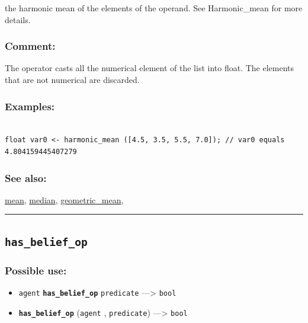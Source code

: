 \documentclass[]{book}
\providecommand{\tightlist}{%
  \setlength{\itemsep}{0pt}\setlength{\parskip}{0pt}}
\theoremstyle{definition}
\theoremstyle{definition}
\theoremstyle{definition}
\theoremstyle{remark}
\begin{document}
the harmonic mean of the elements of the operand. See Harmonic\_mean for
more details.

\subsubsection{Comment:}\label{comment-47}

The operator casts all the numerical element of the list into float. The
elements that are not numerical are discarded.

\subsubsection{Examples:}\label{examples-185}

\begin{verbatim}
 
float var0 <- harmonic_mean ([4.5, 3.5, 5.5, 7.0]); // var0 equals 4.804159445407279
\end{verbatim}

\subsubsection{See also:}\label{see-also-110}

\href{operators-i-to-m.html\#mean}{mean},
\href{operators-i-to-m.html\#median}{median},
\href{operators-d-to-h.html\#geometric_mean}{geometric\_mean},

\begin{center}\rule{0.5\linewidth}{\linethickness}\end{center}

\subsection{\texorpdfstring{\texttt{has\_belief\_op}}{has\_belief\_op}}\label{has_belief_op}

\subsubsection{Possible use:}\label{possible-use-246}

\begin{itemize}
\tightlist
\item
  \texttt{agent} \textbf{\texttt{has\_belief\_op}} \texttt{predicate}
  ---\textgreater{} \texttt{bool}
\item
  \textbf{\texttt{has\_belief\_op}} (\texttt{agent} ,
  \texttt{predicate}) ---\textgreater{} \texttt{bool}
\end{itemize}
\end{document}
